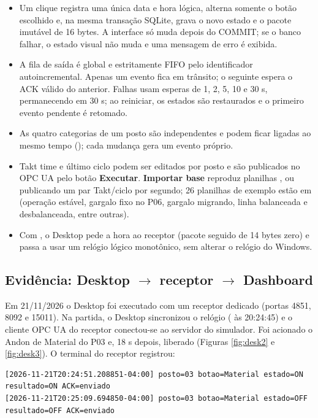 \begin{itemize}
    \item Um clique registra uma única data e hora lógica, alterna somente o botão escolhido e, na mesma transação SQLite, grava o novo estado e o pacote imutável de 16 bytes. A interface só muda depois do COMMIT; se o banco falhar, o estado visual não muda e uma mensagem de erro é exibida.
    \item A fila de saída é global e estritamente FIFO pelo identificador autoincremental. Apenas um evento fica em trânsito; o seguinte espera o ACK válido do anterior. Falhas usam esperas de 1, 2, 5, 10 e 30 s, permanecendo em 30 s; ao reiniciar, os estados são restaurados e o primeiro evento pendente é retomado.
    \item As quatro categorias de um posto são independentes e podem ficar ligadas ao mesmo tempo (); cada mudança gera um evento próprio.
    \item Takt time e último ciclo podem ser editados por posto e são publicados no OPC UA pelo botão \textbf{Executar}. \textbf{Importar base} reproduz planilhas ,  ou  publicando um par Takt/ciclo por segundo; 26 planilhas de exemplo estão em  (operação estável, gargalo fixo no P06, gargalo migrando, linha balanceada e desbalanceada, entre outras).
    \item Com , o Desktop pede a hora ao receptor (pacote  seguido de 14 bytes zero) e passa a usar um relógio lógico monotônico, sem alterar o relógio do Windows.
\end{itemize}

\subsection{Evidência: Desktop $\rightarrow$ receptor $\rightarrow$ Dashboard}

Em 21/11/2026 o Desktop foi executado com um receptor dedicado (portas 4851, 8092 e 15011). Na partida, o Desktop sincronizou o relógio ( às 20:24:45) e o cliente OPC UA do receptor conectou-se ao servidor do simulador. Foi acionado o Andon de Material do P03 e, 18 s depois, liberado (Figuras \ref{fig:desk2} e \ref{fig:desk3}). O terminal do receptor registrou:

{\scriptsize
\begin{verbatim}
[2026-11-21T20:24:51.208851-04:00] posto=03 botao=Material estado=ON resultado=ON ACK=enviado
[2026-11-21T20:25:09.694850-04:00] posto=03 botao=Material estado=OFF resultado=OFF ACK=enviado
\end{verbatim}
}

